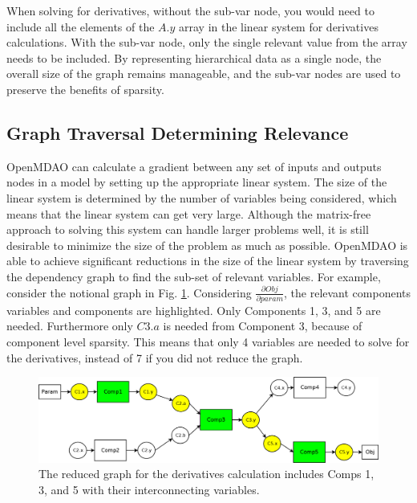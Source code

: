 \documentclass[]{aiaa-tc} %
\begin{document}
    When solving for derivatives, without the sub-var node, you would need to include all the
    elements of the $A.y$ array in the linear system for derivatives calculations.
    With the sub-var node, only the single relevant value from the array needs to be included.
    By representing hierarchical data as a single node, the overall size of the graph
    remains manageable, and the sub-var nodes are used to preserve the benefits of sparsity.


    \subsection{Graph Traversal Determining Relevance}

        OpenMDAO can calculate a gradient between any set of inputs and outputs nodes in a  
        model by setting up the appropriate linear system. The size of the linear system
        is determined by the number of variables being considered, which means that the linear
        system can get very large. Although the matrix-free approach to solving this system 
        can handle larger problems well, it is still desirable to minimize the size of the problem 
        as much as possible. OpenMDAO is able to achieve significant reductions in the
        size of the linear system by traversing the dependency graph to find the sub-set of relevant variables.
        For example, consider the notional graph in Fig. \ref{fig:graph2}. Considering $\frac{\partial Obj}{\partial param}$,
        the relevant components variables and components are highlighted. Only Components 1, 3, and 5 are needed.
        Furthermore only $C3.a$ is needed from Component 3, because of component level sparsity. 
        This means that only 4 variables are needed to solve for the derivatives, 
        instead of 7 if you did not reduce the graph. 

        \begin{figure}[!htb]\begin{center}
          \includegraphics[width=.8\textwidth]{images/Graph2}
          \caption{ The reduced graph for the derivatives calculation includes Comps 1, 3,
          and 5 with their interconnecting variables. \label{fig:graph2}}
        \end{center}\end{figure}
\end{document}
